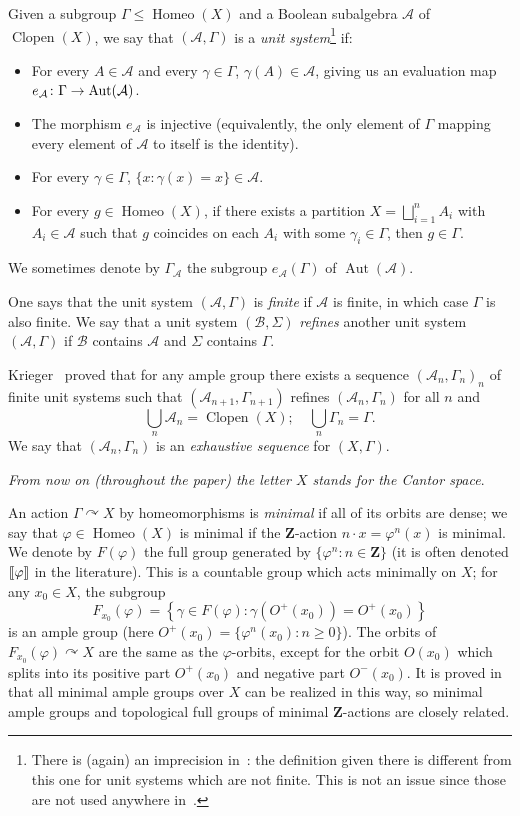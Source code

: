 \documentclass[10pt,a4paper]{article}
\theoremstyle{definition}
\DeclareMathOperator{\Homeo}{Homeo}
\DeclareMathOperator{\Clopen}{Clopen}
\DeclareMathOperator{\Aut}{Aut}
\newcommand{\actson}{\curvearrowright}
\newcommand{\Z}{\mathbf{Z}}
\newcommand{\mcA}{\mathcal{A}}
\newcommand{\mcB}{\mathcal{B}}
\newcommand{\llbracket}{\mathopen{[\mkern -2.7mu[}}
\newcommand{\rrbracket}{\mathclose{]\mkern -2.7mu]}}
\renewcommand*{\to}{\mathchoice{\longrightarrow}{\rightarrow}{\rightarrow}{\rightarrow}}
\begin{document}
Given a subgroup $\Gamma \le \Homeo(X)$ and a Boolean subalgebra $\mcA$ of $\Clopen(X)$, we say that $(\mcA,\Gamma)$ is a \emph{unit system}\footnote{There is (again) an imprecision in~\cite{Melleray2023}: the definition given there is different from this one for unit systems which are not finite. This is not an issue since those are not used anywhere in~\cite{Melleray2023}.} if:
\begin{itemize}
\item For every $A \in \mcA$ and every $\gamma \in \Gamma$, $\gamma(A) \in \mcA$, giving us an evaluation map $e_\mcA \colon \Gamma \to \Aut(\mcA)$.
\item The morphism $e_\mcA$ is injective (equivalently, the only element of $\Gamma$ mapping every element of $\mcA$ to itself is the identity).
\item For every $\gamma \in \Gamma$, $\{x : \gamma(x)= x \} \in \mcA$.
\item For every $g \in \Homeo(X)$, if there exists a partition $X=\bigsqcup_{i=1}^n A_i$ with $A_i \in \mcA$ such that $g$ coincides on each $A_i$ with some $\gamma_i \in \Gamma$, then $g \in \Gamma$.
\end{itemize}
We sometimes denote by $\Gamma_\mcA$ the subgroup $e_\mcA(\Gamma)$ of $\Aut(\mcA)$.

One says that the unit system $(\mcA,\Gamma)$ is \emph{finite} if $\mcA$ is finite, in which case $\Gamma$ is also finite. We say that a unit system $(\mcB,\Sigma)$ \emph{refines} another unit system $(\mcA,\Gamma)$ if $\mcB$ contains $\mcA$ and $\Sigma$ contains $\Gamma$.

Krieger~\cite[Lemma~2.1]{Krieger1979} proved that for any ample group there exists a sequence $(\mcA_n,\Gamma_n)_n$ of finite unit systems such that $(\mcA_{n+1},\Gamma_{n+1})$ refines $(\mcA_n,\Gamma_n)$ for all $n$ and
\[
\bigcup_n \mcA_n=\Clopen(X); \quad \bigcup_n \Gamma_n=\Gamma.
\]
We say that $(\mcA_n,\Gamma_n)$ is an \emph{exhaustive sequence} for $(X,\Gamma)$.

\emph{From now on (throughout the paper) the letter $X$ stands for the Cantor space}.

An action $\Gamma \actson X$ by homeomorphisms is \emph{minimal} if all of its orbits are dense; we say that $\varphi \in \Homeo(X)$ is minimal if the $\Z$-action $n \cdot x=\varphi^n(x)$ is minimal. We denote by $F(\varphi)$ the full group generated by $\{\varphi^n : n \in \Z\}$ (it is often denoted $\llbracket \varphi \rrbracket$ in the literature). This is a countable group which acts minimally on $X$; for any $x_0 \in X$, the subgroup
\[
F_{x_0}(\varphi)= \left\{ \gamma \in F(\varphi) : \gamma(O^+(x_0))=O^+(x_0)\right\}
\]
is an ample group (here $O^+(x_0)=\{ \varphi^n(x_0) : n \ge 0\}$). The orbits of $F_{x_0}(\varphi) \actson X$ are the same as the $\varphi$-orbits, except for the orbit $O(x_0)$ which splits into its positive part $O^+(x_0)$ and negative part $O^-(x_0)$. It is proved in~\cite{Melleray2023} that all minimal ample groups over $X$ can be realized in this way, so minimal ample groups and topological full groups of minimal $\Z$-actions are closely related.
\end{document}
